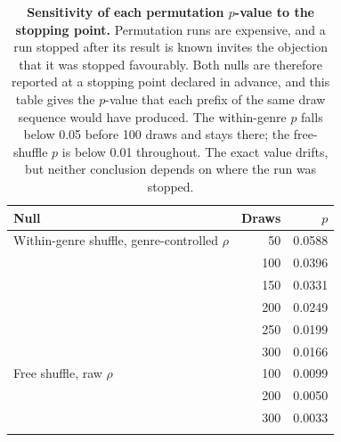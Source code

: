 \begin{table}[!ht]
\centering
\footnotesize
\caption{{\bf Sensitivity of each permutation $p$-value to the stopping point.}  Permutation runs are expensive, and a run stopped after its result is known invites the objection that it was stopped favourably.  Both nulls are therefore reported at a stopping point declared in advance, and this table gives the $p$-value that each prefix of the same draw sequence would have produced.  The within-genre $p$ falls below 0.05 before 100 draws and stays there; the free-shuffle $p$ is below 0.01 throughout.  The exact value drifts, but neither conclusion depends on where the run was stopped.}
\label{tab:s7}
\begin{tabular}{lrr}
\toprule
\textbf{Null} & \textbf{Draws} & \textbf{$p$} \\
\midrule
Within-genre shuffle, genre-controlled $\rho$ & 50 & 0.0588 \\
 & 100 & 0.0396 \\
 & 150 & 0.0331 \\
 & 200 & 0.0249 \\
 & 250 & 0.0199 \\
 & 300 & 0.0166 \\
\addlinespace
Free shuffle, raw $\rho$ & 100 & 0.0099 \\
 & 200 & 0.0050 \\
 & 300 & 0.0033 \\
\addlinespace
\bottomrule
\end{tabular}
\end{table}
